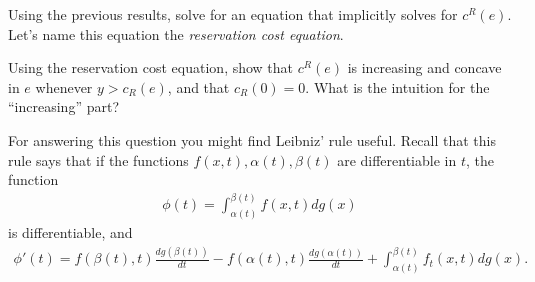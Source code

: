 \documentclass[11pt]{article}
\begin{document}
\item Using the previous results, solve for an equation that implicitly solves for $c^R(e)$. Let's name this equation the \emph{reservation cost equation}.


\item Using the reservation cost equation, show that $c^R(e)$ is increasing and concave in $e$ whenever $y>c_R(e)$, and that $c_R(0)=0$. What is the intuition for the ``increasing'' part?

For answering this question you might find Leibniz' rule useful. Recall that this rule says that if the functions $f(x,t), \alpha(t), \beta(t)$ are differentiable in $t$, the function
\begin{eqnarray}
\phi(t) = \int_{\alpha(t)}^{\beta(t)} f(x,t) dg(x) \nonumber
\end{eqnarray}
is differentiable, and
\begin{eqnarray}
\phi'(t) = f(\beta(t),t) \frac{dg(\beta(t))}{dt} - f(\alpha(t),t)\frac{dg(\alpha(t))}{dt} + \int_{\alpha(t)}^{\beta(t)} f_t(x,t) dg(x). \nonumber
\end{eqnarray}

\end{document}
